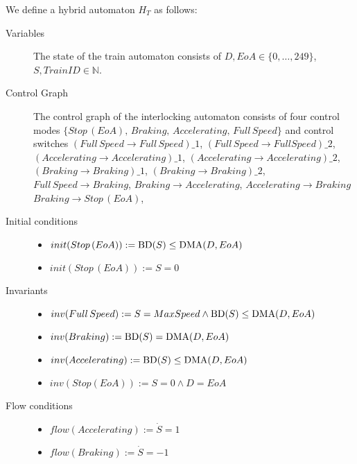\begin{mydef}
We define a hybrid automaton $H_{T}$ as follows:
\begin{description}
\item[Variables] The state of the train automaton consists of $D, EoA \in \{0, \ldots , 249 \}$, $ S, TrainID \in {\mathbb{N}}$. 

\item[Control Graph] The control graph of the interlocking automaton consists of four control modes $\{Stop \, (EoA), \, Braking, \, Accelerating, \, Full \,  Speed \}$ and control switches $(Full \, Speed \to  Full \, Speed)\_1$, $(Full \, Speed \to Full Speed)\_2$, $(Accelerating \to Accelerating)\_1$, $(Accelerating \to Accelerating)\_2$, $(Braking \to Braking)\_1$, $(Braking \to Braking)\_2$,  $Full \, Speed \to Braking$, $Braking \to Accelerating$, $Accelerating \to Braking$  $Braking \to Stop \, (EoA)$, 

\item[Initial conditions] \hspace*{0mm}
\begin{itemize} 
	\item $init(Stop \, (EoA)) :=   \mathrm{BD}(S) \leq \mathrm{DMA}(D,EoA)  $
	\item $init(Stop \, (EoA)) :=   S = 0  $
\end{itemize}

\item[Invariants] \hspace*{0mm}
	\begin{itemize}
	\item $inv(Full \, Speed) :=   S = MaxSpeed \wedge \mathrm{BD}(S) \leq \mathrm{DMA}(D,EoA)$ 

	\item $inv(Braking)  :=  \mathrm{BD}(S) = \mathrm{DMA}(D,EoA)$
         \item $inv(Accelerating) := \mathrm{BD}(S) \leq \mathrm{DMA}(D,EoA)$

	\item $inv(Stop (EoA)) := S = 0 \wedge D = EoA$ 
	\end{itemize}
             
\item[Flow conditions] \hspace*{0mm}
	\begin{itemize}
	\item $flow(Accelerating):= \dot{S} = 1$ 
	
	\item $flow(Braking) := \dot{S} = -1$


\end{itemize}
\end{description}
\end{mydef}
